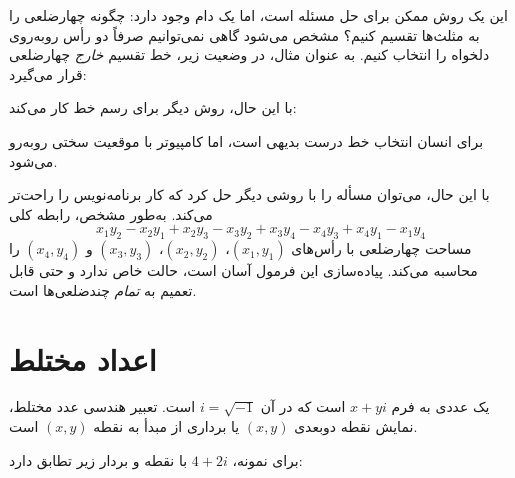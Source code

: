 این یک روش ممکن برای حل مسئله است، اما یک دام وجود دارد: چگونه چهارضلعی را به مثلث‌ها تقسیم کنیم؟ مشخص می‌شود گاهی نمی‌توانیم صرفاً دو رأس روبه‌روی دلخواه را انتخاب کنیم. به عنوان مثال، در وضعیت زیر، خط تقسیم \emph{خارج} چهارضلعی قرار می‌گیرد:
\begin{center}
\end{center}
با این حال، روش دیگر برای رسم خط کار می‌کند:
\begin{center}
\end{center}
برای انسان انتخاب خط درست بدیهی است، اما کامپیوتر با موقعیت سختی روبه‌رو می‌شود.

با این حال، می‌توان مسأله را با روشی دیگر حل کرد که کار برنامه‌نویس را راحت‌تر می‌کند.
به‌طور مشخص، رابطه کلی
\[x_1y_2-x_2y_1+x_2y_3-x_3y_2+x_3y_4-x_4y_3+x_4y_1-x_1y_4\]
مساحت چهارضلعی با رأس‌های
$(x_1,y_1)$،
$(x_2,y_2)$،
$(x_3,y_3)$ و
$(x_4,y_4)$
را محاسبه می‌کند.
پیاده‌سازی این فرمول آسان است، حالت خاص ندارد و حتی قابل تعمیم به \emph{تمام} چندضلعی‌ها است.

\section{اعداد مختلط}


یک  عددی به فرم $x+y i$ است
که در آن $i = \sqrt{-1}$  است.
تعبیر هندسی عدد مختلط،
نمایش نقطه دوبعدی $(x,y)$
یا برداری از مبدأ به نقطه $(x,y)$ است.

برای نمونه، $4+2i$ با نقطه و بردار زیر تطابق دارد:

\begin{center}
\end{center}

